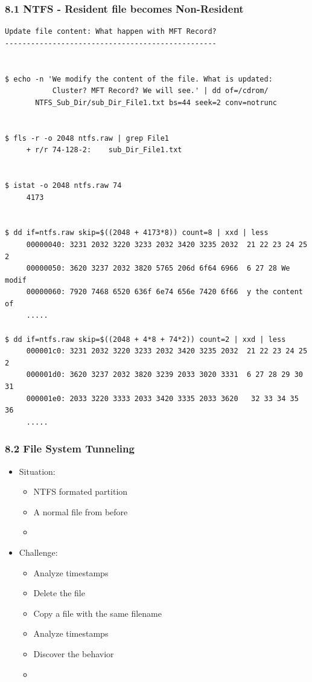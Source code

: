 \begin{frame}[fragile]
  \frametitle{8.1 NTFS - Resident file becomes Non-Resident}
  \begin{lstlisting}[basicstyle=\tiny]
Update file content: What happen with MFT Record?
-------------------------------------------------


$ echo -n 'We modify the content of the file. What is updated:
           Cluster? MFT Record? We will see.' | dd of=/cdrom/
	   NTFS_Sub_Dir/sub_Dir_File1.txt bs=44 seek=2 conv=notrunc


$ fls -r -o 2048 ntfs.raw | grep File1
     + r/r 74-128-2:	sub_Dir_File1.txt


$ istat -o 2048 ntfs.raw 74
     4173


$ dd if=ntfs.raw skip=$((2048 + 4173*8)) count=8 | xxd | less
     00000040: 3231 2032 3220 3233 2032 3420 3235 2032  21 22 23 24 25 2
     00000050: 3620 3237 2032 3820 5765 206d 6f64 6966  6 27 28 We modif
     00000060: 7920 7468 6520 636f 6e74 656e 7420 6f66  y the content of
     .....

$ dd if=ntfs.raw skip=$((2048 + 4*8 + 74*2)) count=2 | xxd | less
     000001c0: 3231 2032 3220 3233 2032 3420 3235 2032  21 22 23 24 25 2
     000001d0: 3620 3237 2032 3820 3239 2033 3020 3331  6 27 28 29 30 31
     000001e0: 2033 3220 3333 2033 3420 3335 2033 3620   32 33 34 35 36 
     .....
  \end{lstlisting}
\end{frame}


\begin{frame}[fragile]
  \frametitle{8.2 File System Tunneling}
  \begin{itemize}
    \item Situation:
    \begin{itemize}
      \item NTFS formated partition
      \item A normal file from before
      \item[]
    \end{itemize}
    \item Challenge:
    \begin{itemize}
      \item Analyze timestamps
      \item Delete the file
      \item Copy a file with the same filename
      \item Analyze timestamps
      \item Discover the behavior
      \item[]
    \end{itemize}
  \end{itemize}
\end{frame}


